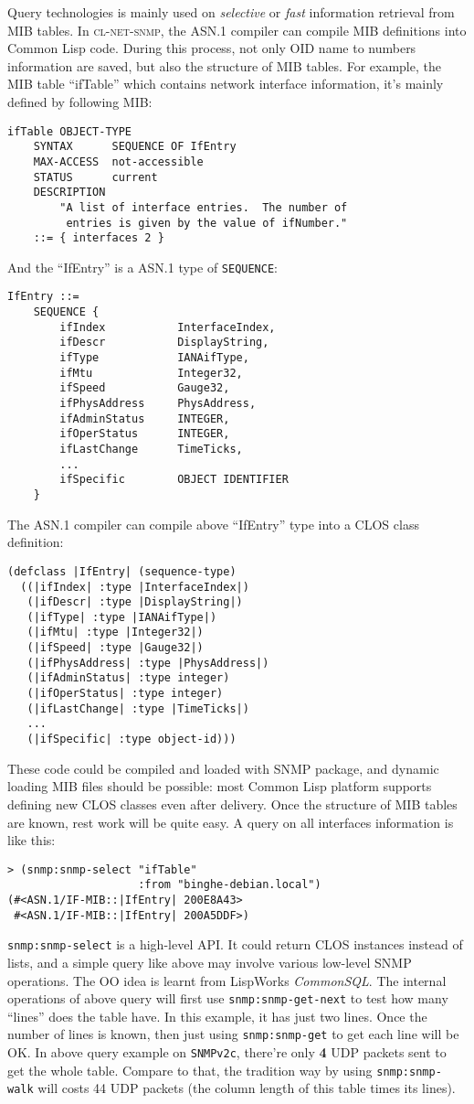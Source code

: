 \documentclass[reprint,natbib,9pt]{sigplanconf}
\begin{document}
Query technologies is mainly used on \textsl{selective} or
\textsl{fast} information retrieval from MIB tables.
In \textsc{cl-net-snmp}, the ASN.1 compiler can compile MIB definitions
into Common Lisp code. During this process, not only OID name to numbers
information are saved, but also the structure of MIB tables. For example,
the MIB table ``ifTable'' which contains network interface information,
it's mainly defined by following MIB:
\begin{verbatim}
ifTable OBJECT-TYPE
    SYNTAX      SEQUENCE OF IfEntry
    MAX-ACCESS  not-accessible
    STATUS      current
    DESCRIPTION
        "A list of interface entries.  The number of
         entries is given by the value of ifNumber."
    ::= { interfaces 2 }
\end{verbatim}
And the ``IfEntry'' is a ASN.1 type of \texttt{SEQUENCE}:
\begin{verbatim}
IfEntry ::=
    SEQUENCE {
        ifIndex           InterfaceIndex,
        ifDescr           DisplayString,
        ifType            IANAifType,
        ifMtu             Integer32,
        ifSpeed           Gauge32,
        ifPhysAddress     PhysAddress,
        ifAdminStatus     INTEGER,
        ifOperStatus      INTEGER,
        ifLastChange      TimeTicks,
        ...
        ifSpecific        OBJECT IDENTIFIER
    }
\end{verbatim}
The ASN.1 compiler can compile above ``IfEntry'' type into a CLOS class definition:
\begin{verbatim}
(defclass |IfEntry| (sequence-type)
  ((|ifIndex| :type |InterfaceIndex|)
   (|ifDescr| :type |DisplayString|)
   (|ifType| :type |IANAifType|)
   (|ifMtu| :type |Integer32|)
   (|ifSpeed| :type |Gauge32|)
   (|ifPhysAddress| :type |PhysAddress|)
   (|ifAdminStatus| :type integer)
   (|ifOperStatus| :type integer)
   (|ifLastChange| :type |TimeTicks|)
   ...
   (|ifSpecific| :type object-id)))
\end{verbatim}
These code could be compiled and loaded with SNMP package, and
dynamic loading MIB files should be possible: most Common Lisp platform
supports defining new CLOS classes even after delivery.
Once the structure of MIB tables are known, rest work will be quite easy.
A query on all interfaces information is like this:
\begin{verbatim}
> (snmp:snmp-select "ifTable"
                    :from "binghe-debian.local")
(#<ASN.1/IF-MIB::|IfEntry| 200E8A43>
 #<ASN.1/IF-MIB::|IfEntry| 200A5DDF>)
\end{verbatim}
\texttt{snmp:snmp-select} is a high-level API. It could return CLOS instances
instead of lists, and a simple query like above may involve various low-level
SNMP operations. The OO idea is learnt from LispWorks
\textsl{CommonSQL}.
The internal operations of above query will first use
\texttt{snmp:snmp-get-next} to test how many ``lines'' does the table have.
In this example, it has just two lines. Once the number of lines is known,
then just using \texttt{snmp:snmp-get} to get each line will be OK. In above
query example on \texttt{SNMPv2c}, there're only \textbf{4} UDP packets sent
to get the whole table. Compare to that, the tradition way
by using \texttt{snmp:snmp-walk} will costs 44 UDP packets (the column length
of this table times its lines).
\end{document}
